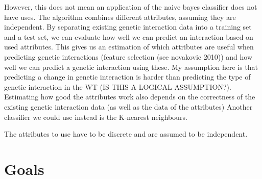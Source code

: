 \documentclass{article}
\begin{document}
However, this does not mean an application of the naive bayes classifier does not have uses. The algorithm combines different attributes, assuming they are independent. By separating existing genetic interaction data into a training set and a test set, we can evaluate how well we can predict an interaction based on used attributes. This gives us an estimation of which attributes are useful when predicting genetic interactions (feature selection (see novakovic 2010)) and how well we can predict a genetic interaction using these. My assumption here is that predicting a change in genetic interaction is harder than predicting the type of genetic interaction in the WT (IS THIS A LOGICAL ASSUMPTION?). Estimating how good the attributes work also depends on the correctness of the existing genetic interaction data (as well as the data of the attributes)
Another classifier we could use instead is the K-nearest neighbours. 

The attributes to use have to be discrete and are assumed to be independent. 


\section{Goals}





\end{document}
